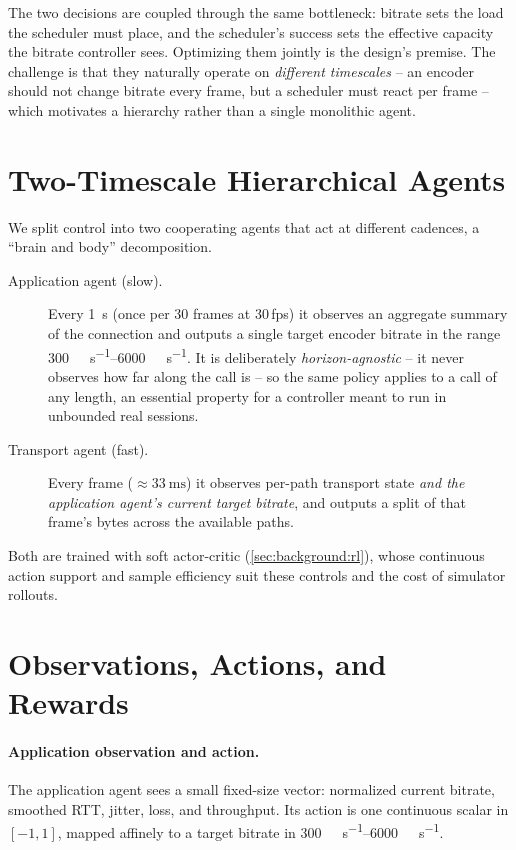 The two decisions are coupled through the same bottleneck: bitrate sets the load the scheduler must
place, and the scheduler's success sets the effective capacity the bitrate controller sees. Optimizing
them jointly is the design's premise. The challenge is that they naturally operate on \emph{different
timescales} -- an encoder should not change bitrate every frame, but a scheduler must react per frame --
which motivates a hierarchy rather than a single monolithic agent.

\section{Two-Timescale Hierarchical Agents}
\label{sec:p2design:hierarchy}

We split control into two cooperating agents that act at different cadences, a ``brain and body''
decomposition.

\begin{description}
  \item[Application agent (slow).] Every \SI{1}{\second} (once per 30 frames at 30\,fps) it observes
  an aggregate summary of the connection and outputs a single target encoder bitrate in the range
  \SIrange{300}{6000}{\kilo\bit\per\second}. It is deliberately \emph{horizon-agnostic} -- it never
  observes how far along the call is -- so the same policy applies to a call of any length, an essential
  property for a controller meant to run in unbounded real sessions.
  \item[Transport agent (fast).] Every frame (${\approx}\SI{33}{\milli\second}$) it observes per-path
  transport state \emph{and the application agent's current target bitrate}, and outputs a split of that
  frame's bytes across the available paths.
\end{description}

Both are trained with soft actor-critic (\cref{sec:background:rl}), whose continuous action support and
sample efficiency suit these controls and the cost of simulator rollouts.

\section{Observations, Actions, and Rewards}
\label{sec:p2design:mdp}

\paragraph{Application observation and action.} The application agent sees a small fixed-size vector:
normalized current bitrate, smoothed RTT, jitter, loss, and throughput. Its action is one continuous
scalar in $[-1,1]$, mapped affinely to a target bitrate in \SIrange{300}{6000}{\kilo\bit\per\second}.

